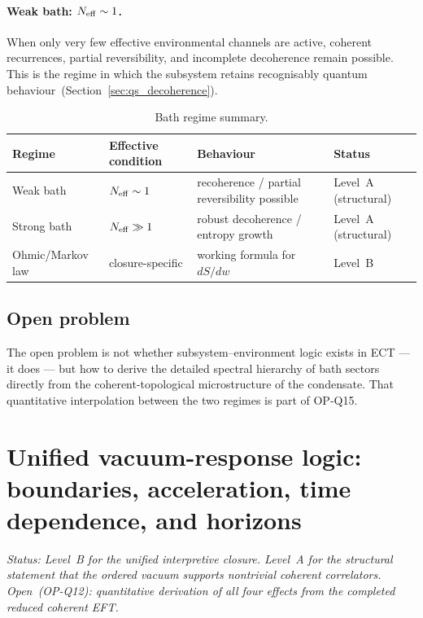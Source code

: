 \paragraph{Weak bath: $N_{\rm eff}\sim 1$.}
When only very few effective environmental channels are active, coherent
recurrences, partial reversibility, and incomplete decoherence remain
possible.
This is the regime in which the subsystem retains recognisably quantum
behaviour~(Section~\ref{sec:qs_decoherence}).

\begin{table}[h]
\centering\small
\renewcommand{\arraystretch}{1.3}
\caption{Bath regime summary.}
\label{tab:bath_regimes}
\begin{tabular}{p{2.8cm}p{4.0cm}p{3.5cm}p{2.5cm}}
\hline\hline
Regime & Effective condition & Behaviour & Status \\
\hline
Weak bath & $N_{\rm eff}\sim 1$ & recoherence / partial reversibility possible
  & Level~A (structural) \\
Strong bath & $N_{\rm eff}\gg 1$ & robust decoherence / entropy growth
  & Level~A (structural) \\
Ohmic/Markov law & closure-specific & working formula for $dS/dw$
  & Level~B \\
\hline\hline
\end{tabular}
\end{table}

\subsection*{Open problem}

The open problem is not whether subsystem--environment logic exists in
ECT --- it does --- but how to derive the detailed spectral hierarchy of
bath sectors directly from the coherent-topological microstructure of the
condensate.
That quantitative interpolation between the two regimes is part of
OP-Q15.

\section{Unified vacuum-response logic: boundaries, acceleration,
time dependence, and horizons}
\label{app:qs_vacuum_response}

\textit{Status: Level~B for the unified interpretive closure.
Level~A for the structural statement that the ordered vacuum supports
nontrivial coherent correlators.
Open~(OP-Q12): quantitative derivation of all four effects from the
completed reduced coherent EFT.}


